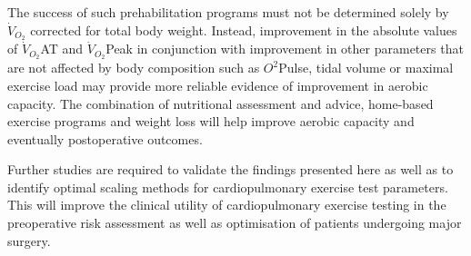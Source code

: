 The success of such prehabilitation programs must not be determined solely by $\dot{V}_{O_2}$ corrected for total body weight. 
Instead, improvement in the absolute values of $\dot{V}_{O_2}$AT and $\dot{V}_{O_2}$Peak in conjunction with improvement in other parameters that are not affected by body composition such as $O^2$Pulse, tidal volume\parencite{jones_effects_2007} or maximal exercise load may provide more reliable evidence of improvement in aerobic capacity. 
The combination of nutritional assessment and advice, home-based exercise programs and weight loss will help improve aerobic capacity and eventually postoperative outcomes. 

Further studies are required to validate the findings presented here as well as to identify optimal scaling methods for cardiopulmonary exercise test parameters. 
This will improve the clinical utility of cardiopulmonary exercise testing in the preoperative risk assessment as well as optimisation of patients undergoing major surgery.















